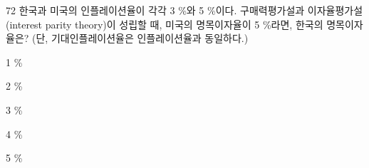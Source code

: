 \begin{question}{72}
한국과 미국의 인플레이션율이 각각 3 \%와 5 \%이다. 구매력평가설과 이자율평가설(interest parity theory)이 성립할 때, 미국의 명목이자율이 5 \%라면, 한국의 명목이자율은? (단, 기대인플레이션율은 인플레이션율과 동일하다.)
\begin{choices}
  \item 1 \%
  \item 2 \%
  \item 3 \%
  \item 4 \%
  \item 5 \%
\end{choices}
\end{question}
